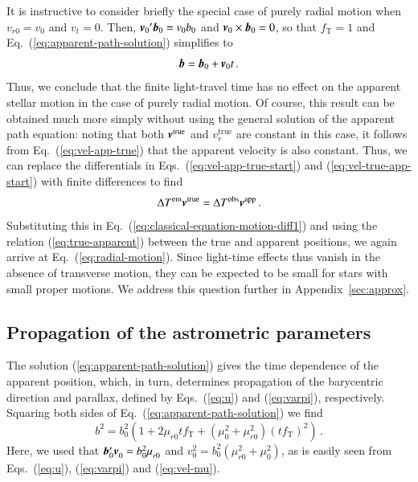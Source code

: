\documentclass{aa}
\def\vec#1{\ensuremath{\mathchoice{\mbox{\boldmath$\displaystyle#1$}}
{\mbox{\boldmath$\textstyle#1$}}
{\mbox{\boldmath$\scriptstyle#1$}}
{\mbox{\boldmath$\scriptscriptstyle#1$}}}}
\begin{document}
It is instructive to consider briefly the special case of purely radial motion
when $v_{r0}=v_0$ and $v_t=0$. Then, ${\vec{v}_0}'\vec{b}_0=v_0b_0$ and $\vec{v}_0\times\vec{b}_0=0$, so that $f_\mathrm{T}=1$ and
Eq.~(\ref{eq:apparent-path-solution}) simplifies to
\begin{equation}\label{eq:radial-motion}
  \vec{b}=\vec{b}_0+\vec{v}_0t\,.
\end{equation}
Thus, we conclude that the finite light-travel time has no effect on the apparent stellar motion in the case of purely radial motion. Of course, this result can be
obtained much more simply without using the general solution of the apparent path equation: noting that both $\vec{v}^\mathrm{true}$ and $v_r^\mathrm{true}$
are constant in this case, it follows from Eq.~(\ref{eq:vel-app-true}) that the apparent velocity is also constant. Thus, we can replace the differentials in
Eqs.~(\ref{eq:vel-app-true-start}) and (\ref{eq:vel-true-app-start}) with finite differences to find
\begin{equation}
 \Delta T^\mathrm{em}\vec{v}^\mathrm{true}=\Delta T^\mathrm{obs}\vec{v}^\mathrm{app}\,.
\end{equation}
Substituting this in Eq.~(\ref{eq:classical-equation-motion-diff1}) and
using the relation (\ref{eq:true-apparent}) between the true and apparent
positions, we again arrive at Eq.~(\ref{eq:radial-motion}).
Since light-time effects thus vanish in the absence of transverse motion,
they can be expected to be small for stars with small proper motions.
We address this question further in Appendix~\ref{sec:approx}.

\subsection{Propagation of the astrometric parameters}
\label{ss:propagation}

The solution (\ref{eq:apparent-path-solution}) gives the time dependence of the apparent position, which, in turn, determines propagation of the barycentric direction and parallax, defined by Eqs.~(\ref{eq:u}) and (\ref{eq:varpi}), respectively. Squaring both sides of Eq.~(\ref{eq:apparent-path-solution}) we find
\begin{equation}
  b^2=b_0^2\left(1+2\mu_{r0}tf_\mathrm{T}+\left(\mu_0^2+\mu_{r0}^2\right)\left(tf_\mathrm{T}\right)^2\right)\,.
\end{equation}
Here, we used that $\vec{b}'_0\vec{v}_0^{\phantom{2}}=b_0^2\mu_{r0}^{\phantom{2}}$ and $v_0^2=b_0^2\left(\mu_{r0}^2+\mu_0^2\right)$, as is easily seen from Eqs.~(\ref{eq:u}), (\ref{eq:varpi}) and (\ref{eq:vel-mu}).
\end{document}
